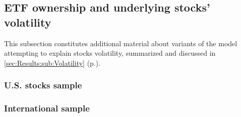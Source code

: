 {\linespread{1.0}
  \begin{landscape}
    
    \subsection{ETF ownership and underlying stocks' volatility}
    \label{app:sec:DetailedResults:Volatility}
    This subsection constitutes additional material about variants of the model attempting to explain stocks volatility, summarized and discussed in \autoref{sec:Results:sub:Volatility} (p.\pageref{sec:Results:sub:Volatility}).
    
    \subsubsection{U.S. stocks sample}
    \begin{table}[H]
      
    \end{table}
    \begin{table}[H]
      
    \end{table}
    \begin{table}[H]
      
    \end{table}
    \begin{table}[H]
      
    \end{table}

    \subsubsection{International sample}
    \begin{table}[H]
      
    \end{table}
    \begin{table}[H]
      
    \end{table}
    \begin{table}[H]
      
    \end{table}
    \begin{table}[H]
      
    \end{table}


\end{landscape}}
